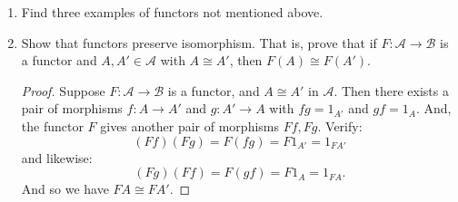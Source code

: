 \documentclass{article}
\begin{document}
\begin{enumerate} 
    \item Find three examples of functors not mentioned above.

    \item Show that functors preserve isomorphism. That is, prove that if $F:\mathscr{A}\to \mathscr{B}$ is a functor and $A,A'\in \mathscr{A}$ with $A\cong A'$, then $F(A)\cong F(A')$.
        \begin{proof} 
            Suppose $F:\mathscr{A}\to \mathscr{B} $ is a functor, and $A\cong A'$ in $\mathscr{A}.$ Then there exists a pair of morphisms $f:A\to A'$ and $g:A'\to A$ with $fg=1_{A'}$ and $gf=1_A$. And, the functor $F$ gives another pair of morphisms $Ff,Fg$. Verify:
            \[
            ( Ff)( Fg)= F(fg)=F1_{A'}=1_{FA'}
            \] 
            and likewise:
            \[
                (Fg)(Ff)=F(gf)=F 1_A=1_{FA}
            .\] 
            And so we have $FA\cong FA'$. 
        \end{proof}


\end{enumerate}
\end{document}
